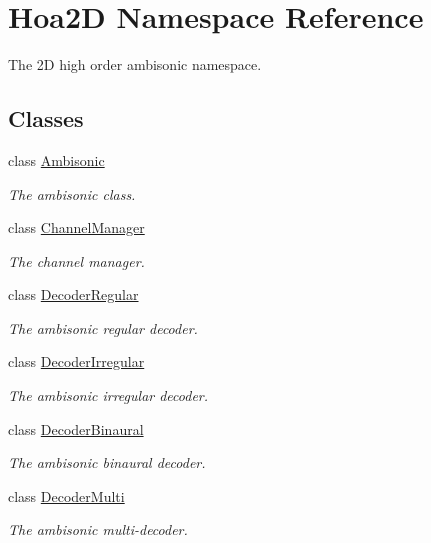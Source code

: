 \hypertarget{namespace_hoa2_d}{\section{Hoa2\-D Namespace Reference}
\label{namespace_hoa2_d}
}


The 2\-D high order ambisonic namespace.  


\subsection*{Classes}
\begin{DoxyCompactItemize}
\item 
class \hyperlink{class_hoa2_d_1_1_ambisonic}{Ambisonic}
\begin{DoxyCompactList}\small\item\em The ambisonic class. \end{DoxyCompactList}\item 
class \hyperlink{class_hoa2_d_1_1_channel_manager}{Channel\-Manager}
\begin{DoxyCompactList}\small\item\em The channel manager. \end{DoxyCompactList}\item 
class \hyperlink{class_hoa2_d_1_1_decoder_regular}{Decoder\-Regular}
\begin{DoxyCompactList}\small\item\em The ambisonic regular decoder. \end{DoxyCompactList}\item 
class \hyperlink{class_hoa2_d_1_1_decoder_irregular}{Decoder\-Irregular}
\begin{DoxyCompactList}\small\item\em The ambisonic irregular decoder. \end{DoxyCompactList}\item 
class \hyperlink{class_hoa2_d_1_1_decoder_binaural}{Decoder\-Binaural}
\begin{DoxyCompactList}\small\item\em The ambisonic binaural decoder. \end{DoxyCompactList}\item 
class \hyperlink{class_hoa2_d_1_1_decoder_multi}{Decoder\-Multi}
\begin{DoxyCompactList}\small\item\em The ambisonic multi-\/decoder. \end{DoxyCompactList}\item 

\end{DoxyCompactItemize}
